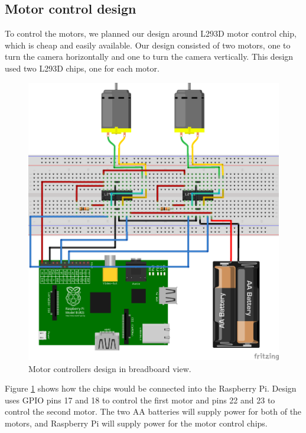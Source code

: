 \documentclass[english,11pt,twoside,a4paper]{article}
\begin{document}
\subsection{Motor control design}

To control the motors, we planned our design around L293D motor control chip, which is cheap and easily available. Our design consisted of two motors, one to turn the camera horizontally and one to turn the camera vertically. This design used two L293D chips, one for each motor.

\begin{figure}
  \begin{center}
    \includegraphics[scale=0.75]{motor_controllers_l293d_bb.png}
    \caption{Motor controllers design in breadboard view.}
  \end{center}
  \label{l293d_bb_design}
\end{figure}

Figure \ref{l293d_bb_design} shows how the chips would be connected into the Raspberry Pi. Design uses GPIO pins 17 and 18 to control the first motor and pins 22 and 23 to control the second motor. The two AA batteries will supply power for both of the motors, and Raspberry Pi will supply power for the motor control chips.
\end{document}
